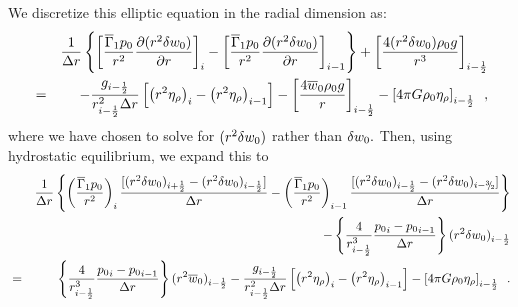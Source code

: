 \noindent We discretize this elliptic equation in the radial dimension as:
\begin{eqnarray}
&& \frac{1}{\Delta r} \left\{
\left[ \frac{\overline{\Gamma}_1 p_0}{r^2} \frac{\partial (r^2 \delta w_0)}{\partial r} \right]_{i} -
\left[ \frac{\overline{\Gamma}_1 p_0}{r^2} \frac{\partial (r^2 \delta w_0)}{\partial r} \right]_{i-1} \right\}
+ \left[ \frac{4 (r^2 \delta w_0) \rho_0 g}{r^3} \right]_{i-\frac{1}{2}} \nonumber\\
&=& 
- \frac{g_{i-\frac{1}{2}}}{r_{i-\frac{1}{2}}^2 \Delta r} 
\left[ \left( r^2 \eta_{\rho} \right)_{i} - \left( r^2 \eta_{\rho}  \right)_{i-1} \right] 
   - \left[ \frac{4 \overline{w}_0 \rho_0 g}{r} \right]_{i-\frac{1}{2}}
   - \left[  4 \pi G \rho_0 \eta_{\rho}   \right]_{i-\frac{1}{2}} \enskip , \nonumber
\end{eqnarray}
where we have chosen to solve for $(r^2 \delta w_0)$ rather than $\delta w_0.$
Then, using hydrostatic equilibrium, we expand this to 
\begin{eqnarray}
&& \frac{1}{\Delta r} \left\{
 \left( \frac{\gammabar p_0}{r^2}\right)_{i  } \frac{[ (r^2 \dw)_{i+\half} - (r^2 \dw)_{i-\half} ]}{\Delta r}
-\left( \frac{\gammabar p_0}{r^2}\right)_{i-1} \frac{[ (r^2 \dw)_{i-\half} - (r^2 \dw)_{i-\thalf}]}{\Delta r} \right\} \nonumber \\
&&  - \left\{ \frac{4}{r_{i-\half} ^3} \frac{{p_0}_i - {p_0}_{i-1}}{\dr} \right\} (r^2 \dw)_{i-\half}  \nonumber \\
&=&   \left\{ \frac{4}{r_{i-\half} ^3} \frac{{p_0}_i - {p_0}_{i-1}}{\dr} \right\} (r^2 \ow)_{i-\half}
 - \frac{g_{i-\half}}{r_{i-\half}^2 \Delta r} 
  \left[ \left( r^2 \etarho \right)_{i} - \left( r^2 \etarho  \right)_{i-1} \right] 
- \left[  4 \pi G \rhozero \etarho   \right]_{i-\half} \enskip.
\end{eqnarray} 

